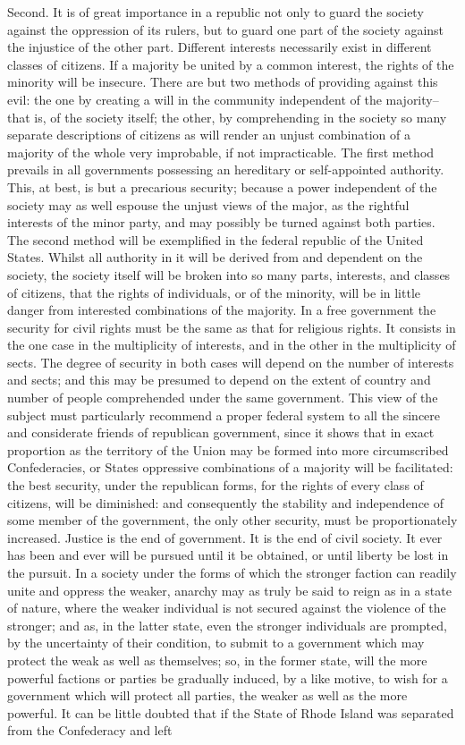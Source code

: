Second. It is of great importance in a republic not only to guard the society against the oppression of its rulers, but to guard one part of the society against the injustice of the other part. Different interests necessarily exist in different classes of citizens. If a majority be united by a common interest, the rights of the minority will be insecure. There are but two methods of providing against this evil: the one by creating a will in the community independent of the majority--that is, of the society itself; the other, by comprehending in the society so many separate descriptions of citizens as will render an unjust combination of a majority of the whole very improbable, if not impracticable. The first method prevails in all governments possessing an hereditary or self-appointed authority. This, at best, is but a precarious security; because a power independent of the society may as well espouse the unjust views of the major, as the rightful interests of the minor party, and may possibly be turned against both parties. The second method will be exemplified in the federal republic of the United States. Whilst all authority in it will be derived from and dependent on the society, the society itself will be broken into so many parts, interests, and classes of citizens, that the rights of individuals, or of the minority, will be in little danger from interested combinations of the majority. In a free government the security for civil rights must be the same as that for religious rights. It consists in the one case in the multiplicity of interests, and in the other in the multiplicity of sects. The degree of security in both cases will depend on the number of interests and sects; and this may be presumed to depend on the extent of country and number of people comprehended under the same government. This view of the subject must particularly recommend a proper federal system to all the sincere and considerate friends of republican government, since it shows that in exact proportion as the territory of the Union may be formed into more circumscribed Confederacies, or States oppressive combinations of a majority will be facilitated: the best security, under the republican forms, for the rights of every class of citizens, will be diminished: and consequently the stability and independence of some member of the government, the only other security, must be proportionately increased. Justice is the end of government. It is the end of civil society. It ever has been and ever will be pursued until it be obtained, or until liberty be lost in the pursuit. In a society under the forms of which the stronger faction can readily unite and oppress the weaker, anarchy may as truly be said to reign as in a state of nature, where the weaker individual is not secured against the violence of the stronger; and as, in the latter state, even the stronger individuals are prompted, by the uncertainty of their condition, to submit to a government which may protect the weak as well as themselves; so, in the former state, will the more powerful factions or parties be gradually induced, by a like motive, to wish for a government which will protect all parties, the weaker as well as the more powerful. It can be little doubted that if the State of Rhode Island was separated from the Confederacy and left 